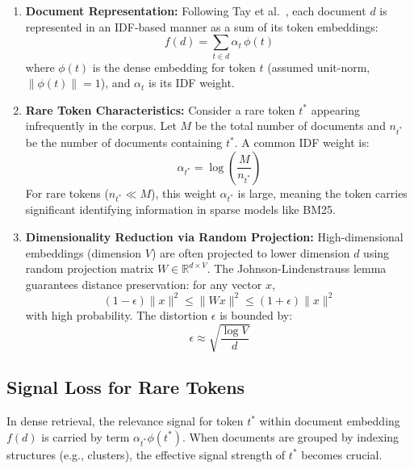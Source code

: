 \documentclass[conference,anonymous]{IEEEtran}
\begin{document}
\begin{enumerate}[label=(\arabic*)]
\item \textbf{Document Representation:} Following Tay et al.\ \cite{tay2020sparse}, each document $d$ is represented in an IDF-based manner as a sum of its token embeddings:
\begin{equation}
f(d) = \sum_{t\in d} \alpha_t\, \phi(t)
\label{eq:doc_rep}
\end{equation}
where $\phi(t)$ is the dense embedding for token $t$ (assumed unit-norm, $\|\phi(t)\| = 1$), and $\alpha_t$ is its IDF weight.

\item \textbf{Rare Token Characteristics:} Consider a rare token $t^*$ appearing infrequently in the corpus. Let $M$ be the total number of documents and $n_{t^*}$ be the number of documents containing $t^*$. A common IDF weight is:
\begin{equation}
\alpha_{t^*} = \log\left(\frac{M}{n_{t^*}}\right)
\label{eq:idf_weight}
\end{equation}
For rare tokens ($n_{t^*} \ll M$), this weight $\alpha_{t^*}$ is large, meaning the token carries significant identifying information in sparse models like BM25.

\item \textbf{Dimensionality Reduction via Random Projection:} High-dimensional embeddings (dimension $V$) are often projected to lower dimension $d$ using random projection matrix $W\in \mathbb{R}^{d\times V}$. The Johnson-Lindenstrauss lemma \cite{johnson1984extensions} guarantees distance preservation: for any vector $x$,
\begin{equation}
(1-\epsilon)\|x\|^2 \leq \|W x\|^2 \leq (1+\epsilon)\|x\|^2
\label{eq:jl_lemma}
\end{equation}
with high probability. The distortion $\epsilon$ is bounded by:
\begin{equation}
\epsilon \approx \sqrt{\frac{\log V}{d}}
\label{eq:jl_error_bound}
\end{equation}
\end{enumerate}

\subsection{Signal Loss for Rare Tokens}

In dense retrieval, the relevance signal for token $t^*$ within document embedding $f(d)$ is carried by term $\alpha_{t^*} \phi(t^*)$. When documents are grouped by indexing structures (e.g., clusters), the effective signal strength of $t^*$ becomes crucial.
\end{document}
